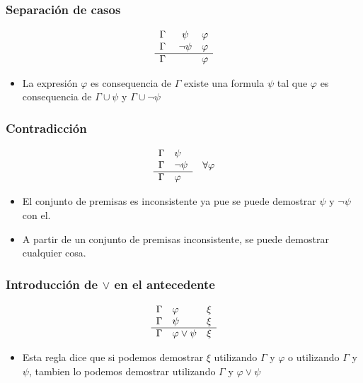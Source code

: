 \documentclass{beamer}
\begin{document}
\begin{frame}
    \frametitle{Separaci\'on de casos}
    \[
        \begin{array}{l c l}
            \Gamma & \psi & \varphi \\
            \Gamma & \neg\psi & \varphi \\
            \hline
            \Gamma\ & & \varphi
        \end{array}
    \]
    \begin{itemize}
        \item{La expresi\'on $\varphi$ es consequencia de $\Gamma$ existe una
        formula $\psi$ tal que $\varphi$ es consequencia de $\Gamma\cup\psi$ y $\Gamma\cup\neg\psi$}
    \end{itemize}
\end{frame}

\begin{frame}
    \frametitle{Contradicci\'on}
    \[
        \begin{array}{l l}
            \Gamma & \psi \\
            \Gamma & \neg\psi \\
            \hline
            \Gamma & \varphi \\
        \end{array}
        \ \ \ \forall \varphi
    \]
    \begin{itemize}
        \item{El conjunto de premisas es inconsistente ya pue se puede
            demostrar $\psi$ y $\neg\psi$ con el.}
        \item{A partir de un conjunto de premisas inconsistente, se puede
            demostrar cualquier cosa.}
    \end{itemize}
\end{frame}

\begin{frame}
    \frametitle{Introducci\'on de $\vee$ en el antecedente}
    \[
        \begin{array}{l l l}
            \Gamma & \varphi & \xi \\
            \Gamma & \psi & \xi \\
            \hline
            \Gamma & \varphi \vee \psi & \xi
        \end{array}
    \]
    \begin{itemize}
        \item{Esta regla dice que si podemos demostrar $\xi$ utilizando
            $\Gamma$ y $\varphi$ o utilizando $\Gamma$ y $\psi$, tambien lo
            podemos demostrar utilizando $\Gamma$ y $\varphi\vee\psi$}
    \end{itemize}
\end{frame}
\end{document}
